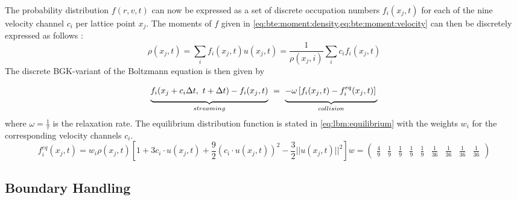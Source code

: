 The probability distribution $f(r,v,t)$ can now be expressed as a set of discrete occupation numbers $f_i(x_j,t)$ for each of the nine velocity channel $c_i$ per lattice point $x_j$. The moments of $f$ given in \cref{eq:bte:moment:density,eq:bte:moment:velocity} can then be discretely expressed as follows \cite{timm2016lattice}:
\begin{subequations}
    \begin{equation}
        \rho(x_j,t) = \sum_i f_i(x_j,t)
        \label{eq:lbm:moment:density}
    \end{equation}
    \begin{equation}
        u(x_j,t) = \frac{1}{\rho(x_j,i)} \sum_i c_i f_i(x_j,t)
        \label{eq:lbm:moment:velocity}
    \end{equation}
    \label{eq:lbm:moment}
\end{subequations}
The discrete BGK-variant of the Boltzmann equation \cite{BGK} is then given by
\begin{equation}
    \underbrace{f_i(x_j + c_i \Delta t,~ t + \Delta t) - f_i(x_j, t)\vphantom{\frac{1}{2}}}_{streaming} ~=~ \underbrace{-\omega \left[ f_i(x_j,t) - f_i^{eq}(x_j,t) \right]\vphantom{\frac{1}{2}}}_{collision}
    \label{eq:lbm:dicretized}
\end{equation}
where $\omega = \frac{1}{\tau}$ is the relaxation rate. The equilibrium distribution function is stated in \cref{eq:lbm:equilibrium} \cite{mohamad2019} with the weights $w_i$ for the corresponding velocity channels $c_i$.
\begin{subequations}
    \begin{equation}
        f_i^{eq}(x_j,t) = w_i \rho(x_j,t) \left[ 1 + 3c_i \cdot u(x_j,t) + \frac{9}{2}(c_i \cdot u(x_j,t))^2 - \frac{3}{2} ||u(x_j,t)||^2 \right]
        \label{eq:lbm:equilibrium}
    \end{equation}
    \begin{equation}
        w = \begin{pmatrix}
            \frac{4}{9} & \frac{1}{9} & \frac{1}{9} & \frac{1}{9} & \frac{1}{9} & \frac{1}{36} & \frac{1}{36} & \frac{1}{36} & \frac{1}{36}
        \end{pmatrix}
    \end{equation}
\end{subequations}

\subsection{Boundary Handling}
\label{sec:methods:boundaries}

